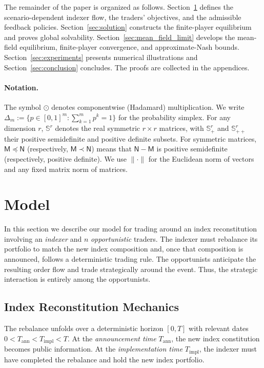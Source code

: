 \documentclass[12pt]{article}
\numberwithin{equation}{section}
\theoremstyle{definition}
\begin{document}
The remainder of the paper is organized as follows.
Section~\ref{sec:model} defines the scenario-dependent indexer flow, the
traders' objectives, and the admissible feedback policies.
Section~\ref{sec:solution} constructs the finite-player equilibrium and proves
global solvability.
Section~\ref{sec:mean_field_limit} develops the mean-field equilibrium,
finite-player convergence, and approximate-Nash bounds.
Section~\ref{sec:experiments} presents numerical illustrations and Section~\ref{sec:conclusion} concludes.
The proofs are collected in the appendices.

\paragraph{Notation.}
The symbol \(\odot\) denotes componentwise (Hadamard) multiplication.
We write \(\Delta_m:=\{p\in[0,1]^m:\sum_{k=1}^m p^k=1\}\) for the
probability simplex.
For any dimension \(r\), \(\mathbb S^r\) denotes the real symmetric
\(r\times r\) matrices, with \(\mathbb S_+^r\) and \(\mathbb S_{++}^r\)
their positive semidefinite and positive definite subsets.
For symmetric matrices, \(\mathsf M\preceq\mathsf N\)
(respectively, \(\mathsf M\prec\mathsf N\)) means that
\(\mathsf N-\mathsf M\) is positive semidefinite (respectively, positive
definite).
We use \(\|\cdot\|\) for the Euclidean norm of vectors and any fixed matrix
norm of matrices.

\section{Model}\label{sec:model}

In this section we describe our model for trading around an index reconstitution involving an
\emph{indexer} and $n$ \emph{opportunistic} traders. The indexer must rebalance
its portfolio to match the new index composition and, once that composition is
announced, follows a deterministic trading rule. The opportunists anticipate
the resulting order flow and trade strategically around the event. Thus, the
strategic interaction is entirely among the opportunists.

\subsection{Index Reconstitution Mechanics}\label{sec:index-mechanics}

The rebalance unfolds over a deterministic horizon $[0,T]$ with relevant dates $0<T_{\mathrm{ann}}<T_{\mathrm{impl}}<T$.
At the \emph{announcement time} $T_{\mathrm{ann}}$, the new index constitution becomes
public information. At the \emph{implementation time} $T_{\mathrm{impl}}$, the indexer
must have completed the rebalance and hold the new index portfolio.
\end{document}
